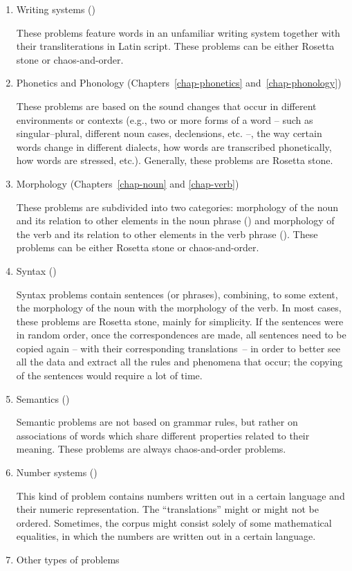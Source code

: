 \begin{enumerate}
    \item Writing systems ()

    These problems feature words in an unfamiliar writing system together with their transliterations in Latin script. These problems can be either Rosetta stone or chaos-and-order.
    \item Phonetics and Phonology (Chapters~\ref{chap-phonetics} and~\ref{chap-phonology})

These problems are based on the sound changes that occur in different environments or contexts (e.g., two or more forms of a word -- such as singular--plural, different noun cases, declensions, etc. --, the way certain words change in different dialects, how words are transcribed phonetically, how words are stressed, etc.). Generally, these problems are Rosetta stone.
\item Morphology (Chapters~\ref{chap-noun} and \ref{chap-verb})

These problems are subdivided into two categories: morphology of the noun and its relation to other elements in the noun phrase () and morphology of the verb and its relation to other elements in the verb phrase (). These problems can be either Rosetta stone or chaos-and-order.
\item Syntax ()

Syntax problems contain sentences (or phrases), combining, to some extent, the morphology of the noun with the morphology of the verb. In most cases, these problems are Rosetta stone, mainly for simplicity. If the sentences were in random order, once the correspondences are made, all sentences need to be copied again – with their corresponding translations~– in order to better see all the data and extract all the rules and phenomena that occur; the copying of the sentences would require a lot of time.
\item Semantics ()

Semantic problems are not based on grammar rules, but rather on associations of words which share different properties related to their meaning. These problems are always chaos-and-order problems.
\item Number systems ()

This kind of problem contains numbers written out in a certain language and their numeric representation. The ``translations'' might or might not be ordered. Sometimes, the corpus might consist solely of some mathematical equalities, in which the numbers are written out in a certain language.
\item Other types of problems


\end{enumerate}
